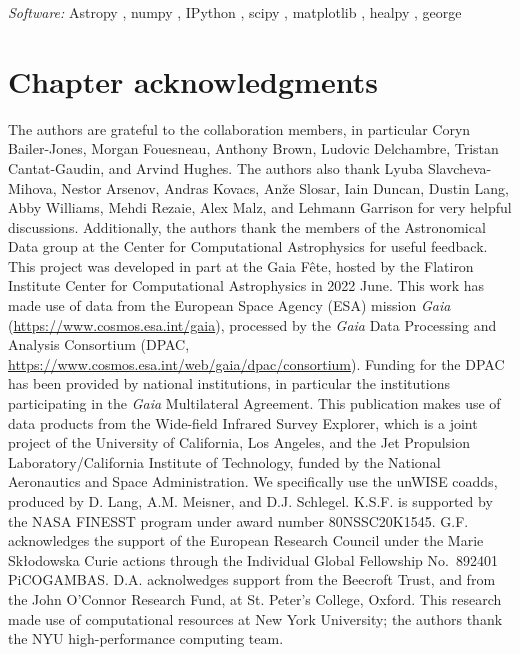 \textit{Software:} Astropy \citep{the_astropy_collaboration_astropy_2013, the_astropy_collaboration_astropy_2018, the_astropy_collaboration_astropy_2022}, numpy \citep{VanDerWalt2011}, IPython \citep{Perez2007}, scipy \citep{Virtanen2020}, matplotlib \citep{Hunter2007}, healpy \citep{gorski_healpix_2005, zonca_healpy_2019}, george \citep{Ambikasaran2016}


\section{Chapter acknowledgments}

The authors are grateful to the \Gaia collaboration members, in particular Coryn Bailer-Jones, Morgan Fouesneau, Anthony Brown, Ludovic Delchambre, Tristan Cantat-Gaudin, and Arvind Hughes.
The authors also thank Lyuba Slavcheva-Mihova, Nestor Arsenov, Andras Kovacs, An\v{z}e Slosar, Iain Duncan,  Dustin Lang, Abby Williams, Mehdi Rezaie, Alex Malz, and Lehmann Garrison for very helpful discussions.
Additionally, the authors thank the members of the Astronomical Data group at the Center for Computational Astrophysics for useful feedback.
This project was developed in part at the Gaia Fête, hosted by the Flatiron Institute Center for Computational Astrophysics in 2022 June.
This work has made use of data from the European Space Agency (ESA) mission {\it Gaia} (\url{https://www.cosmos.esa.int/gaia}), processed by the {\it Gaia} Data Processing and Analysis Consortium (DPAC, \url{https://www.cosmos.esa.int/web/gaia/dpac/consortium}).
Funding for the DPAC has been provided by national institutions, in particular the institutions participating in the {\it Gaia} Multilateral Agreement.
This publication makes use of data products from the Wide-field Infrared Survey Explorer, which is a joint project of the University of California, Los Angeles, and the Jet Propulsion Laboratory/California Institute of Technology, funded by the National Aeronautics and Space Administration.
We specifically use the unWISE coadds, produced by D. Lang, A.M. Meisner, and D.J. Schlegel.
K.S.F. is supported by the NASA FINESST program under award number 80NSSC20K1545. 
G.F. acknowledges the support of the European Research Council under the Marie Sk\l{}odowska Curie actions through the Individual Global Fellowship No.~892401 PiCOGAMBAS.
D.A. acknolwedges support from the Beecroft Trust, and from the John O'Connor Research Fund, at St. Peter's College, Oxford.
This research made use of computational resources at New York University; the authors thank the NYU high-performance computing team.
